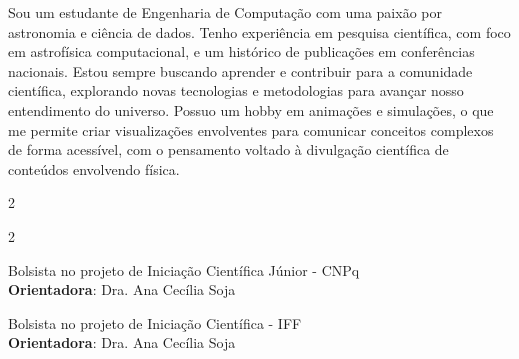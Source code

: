 \begin{fullwidth}
  

Sou um estudante de Engenharia de Computação com uma paixão por astronomia e ciência de dados. Tenho experiência em pesquisa científica, com foco em astrofísica computacional, e um histórico de publicações em conferências nacionais. Estou sempre buscando aprender e contribuir para a comunidade científica, explorando novas tecnologias e metodologias para avançar nosso entendimento do universo. Possuo um hobby em animações e simulações, o que me permite criar visualizações envolventes para comunicar conceitos complexos de forma acessível, com o pensamento voltado à divulgação científica de conteúdos envolvendo física.

\medskip


\begin{multicols}{2}

\columnbreak

\end{multicols}

\smallskip


\begin{multicols}{2}

Bolsista no projeto de Iniciação Científica Júnior - CNPq \\
\textbf{Orientadora}: Dra. Ana Cecília Soja

\divider

Bolsista no projeto de Iniciação Científica - IFF \\
\textbf{Orientadora}: Dra. Ana Cecília Soja

\columnbreak


\end{multicols}
\end{fullwidth}
